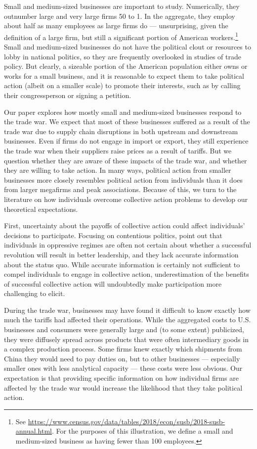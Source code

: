 \documentclass{article}
\begin{document}
Small and medium-sized businesses are important to study. Numerically, they outnumber large and very large firms 50 to 1. In the aggregate, they employ about half as many employees as large firms do --- unsurprising, given the definition of a large firm, but still a significant portion of American workers.\footnote{See \url{https://www.census.gov/data/tables/2018/econ/susb/2018-susb-annual.html}. For the purposes of this illustration, we define a small and medium-sized business as having fewer than 100 employees.} Small and medium-sized businesses do not have the political clout or resources to lobby in national politics, so they are frequently overlooked in studies of trade policy. But clearly, a sizeable portion of the American population either owns or works for a small business, and it is reasonable to expect them to take political action (albeit on a smaller scale) to promote their interests, such as by calling their congressperson or signing a petition.

Our paper explores how mostly small and medium-sized businesses respond to the trade war. We expect that most of these businesses suffered as a result of the trade war due to supply chain disruptions in both upstream and downstream businesses. Even if firms do not engage in import or export, they still experience the trade war when their suppliers raise prices as a result of tariffs. But we question whether they are aware of these impacts of the trade war, and whether they are willing to take action. In many ways, political action from smaller businesses more closely resembles political action from individuals than it does from larger megafirms and peak associations. Because of this, we turn to the literature on how individuals overcome collective action problems to develop our theoretical expectations.

First, uncertainty about the payoffs of collective action could  affect individuals' decisions to participate. Focusing on contentious politics, \citet{shadmehr2011collective} point out that individuals in oppressive regimes are often not certain about whether a successful revolution will result in better leadership, and they lack accurate information about the status quo. While accurate information is certainly not sufficient to compel individuals to engage in collective action, underestimation of the benefits of successful collective action will undoubtedly make participation more challenging to elicit.

During the trade war, businesses may have found it difficult to know exactly how much the tariffs had affected their operations. While the aggregated costs to U.S. businesses and consumers were generally large and (to some extent) publicized, they were diffusely spread across products that were often intermediary goods in a complex production process. Some firms knew exactly which shipments from China they would need to pay duties on, but to other businesses --- especially smaller ones with less analytical capacity --- these costs were less obvious. Our expectation is that providing specific information on how individual firms are affected by the trade war would increase the likelihood that they take political action.
\end{document}
